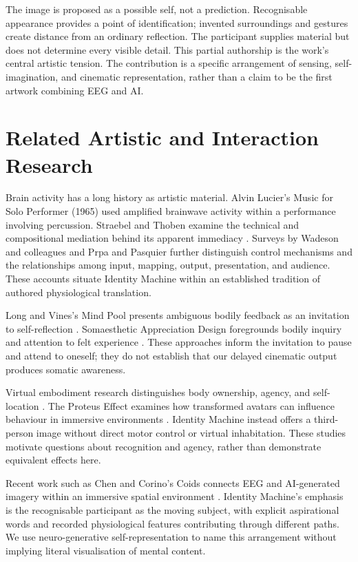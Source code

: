 \documentclass[manuscript,screen,nonacm]{acmart}
\begin{document}
The image is proposed as a possible self, not a prediction. Recognisable appearance provides a point of identification; invented surroundings and gestures create distance from an ordinary reflection. The participant supplies material but does not determine every visible detail. This partial authorship is the work's central artistic tension. The contribution is a specific arrangement of sensing, self-imagination, and cinematic representation, rather than a claim to be the first artwork combining EEG and AI.

\section{Related Artistic and Interaction Research}
Brain activity has a long history as artistic material. Alvin Lucier's Music for Solo Performer (1965) used amplified brainwave activity within a performance involving percussion. Straebel and Thoben examine the technical and compositional mediation behind its apparent immediacy \cite{r1}. Surveys by Wadeson and colleagues \cite{r2} and Prpa and Pasquier \cite{r3} further distinguish control mechanisms and the relationships among input, mapping, output, presentation, and audience. These accounts situate Identity Machine within an established tradition of authored physiological translation.

Long and Vines's Mind Pool presents ambiguous bodily feedback as an invitation to self-reflection \cite{r4}. Somaesthetic Appreciation Design foregrounds bodily inquiry and attention to felt experience \cite{r5}. These approaches inform the invitation to pause and attend to oneself; they do not establish that our delayed cinematic output produces somatic awareness.

Virtual embodiment research distinguishes body ownership, agency, and self-location \cite{r6}. The Proteus Effect examines how transformed avatars can influence behaviour in immersive environments \cite{r7}. Identity Machine instead offers a third-person image without direct motor control or virtual inhabitation. These studies motivate questions about recognition and agency, rather than demonstrate equivalent effects here.

Recent work such as Chen and Corino's Coids connects EEG and AI-generated imagery within an immersive spatial environment \cite{r8}. Identity Machine's emphasis is the recognisable participant as the moving subject, with explicit aspirational words and recorded physiological features contributing through different paths. We use neuro-generative self-representation to name this arrangement without implying literal visualisation of mental content.
\end{document}

